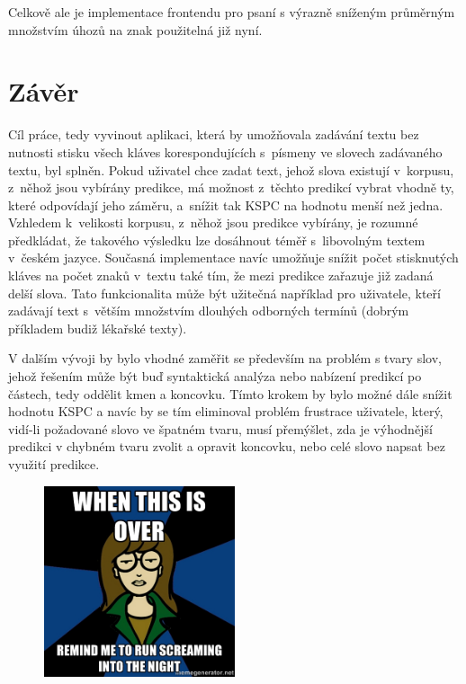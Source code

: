 \documentclass[a4paper,11pt,openany]{book} %
\begin{document}
Celkově ale je implementace frontendu pro psaní s výrazně sníženým průměrným množstvím úhozů na znak použitelná již nyní.

\section*{Závěr}

Cíl práce, tedy vyvinout aplikaci, která by umožňovala zadávání textu bez nutnosti stisku všech kláves korespondujících s~písmeny ve slovech zadávaného textu, byl splněn. Pokud uživatel chce zadat text, jehož slova existují v~korpusu, z~něhož jsou vybírány predikce, má možnost z~těchto predikcí vybrat vhodně ty, které odpovídají jeho záměru, a~snížit tak KSPC na hodnotu menší než jedna. Vzhledem k~velikosti korpusu, z~něhož jsou predikce vybírány, je rozumné předkládat, že takového výsledku lze dosáhnout téměř s~libovolným textem v~českém jazyce. Současná implementace navíc umožňuje snížit počet stisknutých kláves na počet znaků v~textu také tím, že mezi predikce zařazuje již zadaná delší slova. Tato funkcionalita může být užitečná například pro uživatele, kteří zadávají text s~větším množstvím dlouhých odborných termínů (dobrým příkladem budiž lékařské texty).

V dalším vývoji by bylo vhodné zaměřit se především na problém s tvary slov, jehož řešením může být buď syntaktická analýza nebo nabízení predikcí po částech, tedy oddělit kmen a koncovku. Tímto krokem by bylo možné dále snížit hodnotu KSPC a navíc by se tím eliminoval problém frustrace uživatele, který, vidí-li požadované slovo ve špatném tvaru, musí přemýšlet, zda je výhodnější predikci v chybném tvaru zvolit a opravit koncovku, nebo celé slovo napsat bez využití predikce. 

\begin{figure}[h]
	\centering
	\includegraphics[width=0.5\textwidth]{daria}
\end{figure}

\clearpage

\printbibliography[title={Seznam literatury}]
\end{document}
